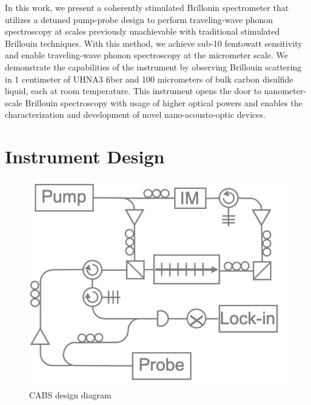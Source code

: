 \documentclass[
sn-nature,
twocolumn
]{sn-jnl}%
\begin{document}
In this work, we present a coherently stimulated Brillouin spectrometer that utilizes a detuned pump-probe design to perform traveling-wave phonon spectroscopy at scales previously unachievable with traditional stimulated Brillouin techniques. With this method, we achieve sub-10 femtowatt sensitivity and enable traveling-wave phonon spectroscopy at the micrometer scale. We demonstrate the capabilities of the instrument by observing Brillouin scattering in 1 centimeter of UHNA3 fiber and 100 micrometers of bulk carbon disulfide liquid, each at room temperature. This instrument opens the door to nanometer-scale Brillouin spectroscopy with usage of higher optical powers and enables the characterization and development of novel nano-acousto-optic devices.



\section{Instrument Design}\label{Instrument Design}

\begin{figure}[t]
\centering
\includegraphics[width=.45\textwidth]{CABS.png}
\caption{CABS design diagram}\label{fig:CABS}
\end{figure}
\end{document}
